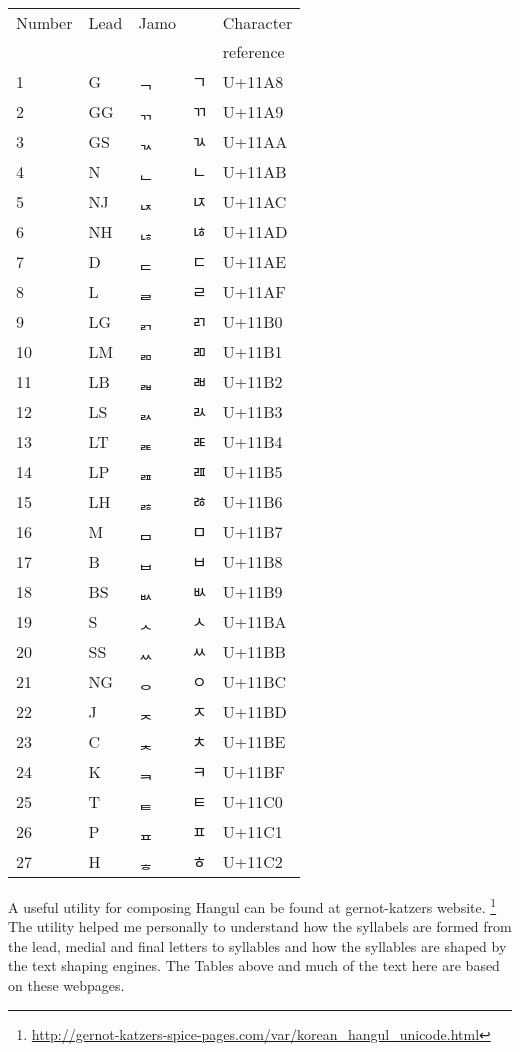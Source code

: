 \begingroup
{}%
\begin{longtable}{ll >{\korean}l >{\korean}l >{\ttfamily}l}
\toprule
Number	&Lead	&Jamo	& &Character\\ 
        &     &     & &reference\\
\midrule 
1	&G	 &ᆨ	&ㄱ	& U+11A8\\
2	&GG	&ᆩ	&ㄲ	& U+11A9\\
3	&GS	&ᆪ	&ㄳ	& U+11AA\\
4	&N	   &ᆫ	&ㄴ	& U+11AB\\
5	&NJ	&ᆬ	&ㄵ	& U+11AC\\
6	&NH	&ᆭ	&ㄶ	& U+11AD\\
7	&D	&ᆮ	&ㄷ	& U+11AE\\
8	&L	&ᆯ	&ㄹ	& U+11AF\\
9	&LG	&ᆰ	&ㄺ	& U+11B0\\
10	&LM	&ᆱ	&ㄻ	& U+11B1\\
11	&LB	&ᆲ	&ㄼ	& U+11B2\\
12	&LS	&ᆳ	&ㄽ	& U+11B3\\
13	&LT	&ᆴ	&ㄾ	& U+11B4\\
14	&LP	&ᆵ	&ㄿ	& U+11B5\\
15	&LH	&ᆶ	&ㅀ	& U+11B6\\
16	&M	&ᆷ	&ㅁ	& U+11B7\\
17	&B	&ᆸ	&ㅂ	& U+11B8\\
18	&BS	&ᆹ	&ㅄ	& U+11B9\\
19	&S	&ᆺ	&ㅅ	& U+11BA\\
20	&SS	&ᆻ	&ㅆ	& U+11BB\\
21	&NG	&ᆼ	&ㅇ	& U+11BC\\
22	&J	&ᆽ	&ㅈ	& U+11BD\\
23	&C	&ᆾ	&ㅊ	& U+11BE\\
24	&K	&ᆿ	&ㅋ	& U+11BF\\
25	&T	&ᇀ	&ㅌ	& U+11C0\\
26	&P	&ᇁ	&ㅍ	& U+11C1\\
27	&H	&ᇂ	&ㅎ	& U+11C2\\
\bottomrule
\end{longtable}
\endgroup

A useful utility for composing Hangul can be found at gernot-katzers website.
\footnote{\url{http://gernot-katzers-spice-pages.com/var/korean_hangul_unicode.html}} The utility helped me personally to understand how the syllabels are formed from the lead, medial and final letters to syllables and how the syllables are shaped by the text shaping engines. The Tables above and much of the text here are based on these webpages. 

